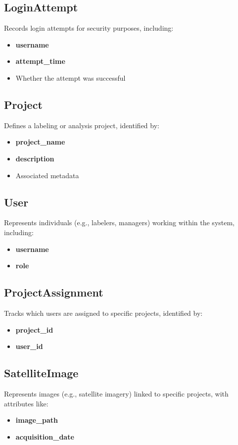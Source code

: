 \documentclass[12pt, titlepage]{article}
\begin{document}
\subsection*{LoginAttempt}
Records login attempts for security purposes, including:
\begin{itemize}
    \item \textbf{username}
    \item \textbf{attempt\_time}
    \item Whether the attempt was successful
\end{itemize}

\subsection*{Project}
Defines a labeling or analysis project, identified by:
\begin{itemize}
    \item \textbf{project\_name}
    \item \textbf{description}
    \item Associated metadata
\end{itemize}

\subsection*{User}
Represents individuals (e.g., labelers, managers) working within the system, including:
\begin{itemize}
    \item \textbf{username}
    \item \textbf{role}
\end{itemize}

\subsection*{ProjectAssignment}
Tracks which users are assigned to specific projects, identified by:
\begin{itemize}
    \item \textbf{project\_id}
    \item \textbf{user\_id}
\end{itemize}

\subsection*{SatelliteImage}
Represents images (e.g., satellite imagery) linked to specific projects, with attributes like:
\begin{itemize}
    \item \textbf{image\_path}
    \item \textbf{acquisition\_date}
\end{itemize}
\end{document}
